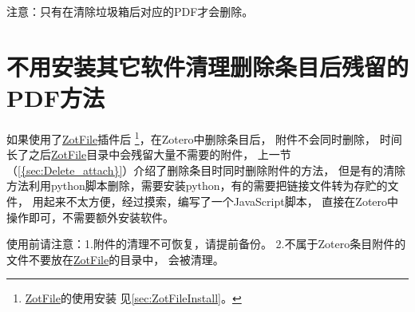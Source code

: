 \documentclass[cn,11pt,chinese]{elegantbook}
\begin{document}
	注意：只有在清除垃圾箱后对应的PDF才会删除。

	\section{不用安装其它软件清理删除条目后残留的PDF方法}\label{sec:delPDFUingJS}
			如果使用了\href{http://zotfile.com/}{ZotFile}插件后
			\footnote{\href{http://zotfile.com/}{ZotFile}的使用安装
			见\cref{sec:ZotFileInstall}。}，在Zotero中删除条目后，
			附件不会同时删除，
			时间长了之后\href{http://zotfile.com/}{ZotFile}目录中会残留大量不需要的附件，
			上一节（\cref{{sec:Delete_attach}}）介绍了删除条目时同时删除附件的方法，
			但是有的清除方法利用python脚本删除，需要安装python，有的需要把链接文件转为存贮的文件，
			用起来不太方便，经过摸索，编写了一个JavaScript脚本，
			直接在Zotero中操作即可，不需要额外安装软件。
			
			使用前请注意：1.附件的清理不可恢复，请提前备份。
			2.不属于Zotero条目附件的文件不要放在\href{http://zotfile.com/}{ZotFile}的目录中，
			会被清理。
\end{document}
